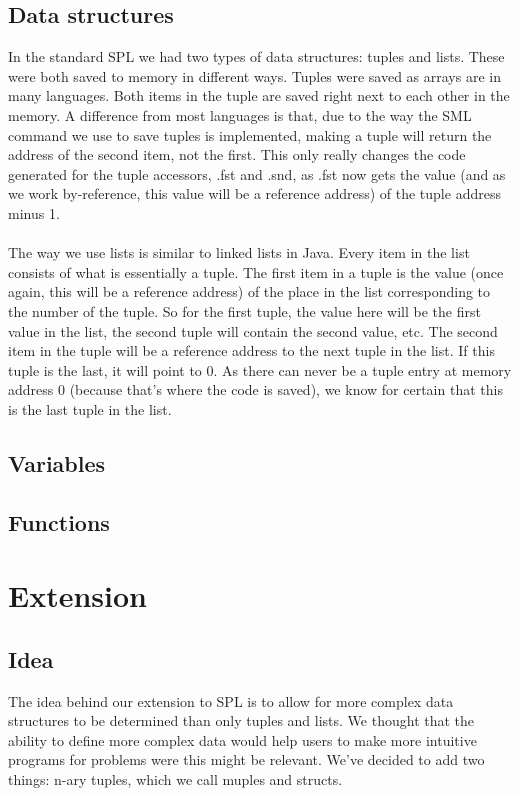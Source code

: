 \documentclass[10pt,a4paper]{article}
\begin{document}
\subsection{Data structures}
In the standard SPL we had two types of data structures: tuples and lists. These were both saved to memory in different ways. Tuples were saved as arrays are in many languages. Both items in the tuple are saved right next to each other in the memory. A difference from most languages is that, due to the way the SML command we use to save tuples is implemented, making a tuple will return the address of the second item, not the first. This only really changes the code generated for the tuple accessors, .fst and .snd, as .fst now gets the value (and as we work by-reference, this value will be a reference address) of the tuple address minus 1.\\
\\
The way we use lists is similar to linked lists in Java. Every item in the list consists of what is essentially a tuple. The first item in a tuple is the value (once again, this will be a reference address) of the place in the list corresponding to the number of the tuple. So for the first tuple, the value here will be the first value in the list, the second tuple will contain the second value, etc. The second item in the tuple will be a reference address to the next tuple in the list. If this tuple is the last, it will point to 0. As there can never be a tuple entry at memory address 0 (because that's where the code is saved), we know for certain that this is the last tuple in the list.
\subsection{Variables}
\subsection{Functions}


\section{Extension}
\subsection{Idea}
The idea behind our extension to SPL is to allow for more complex data structures to be determined than only tuples and lists. We thought that the ability to define more complex data would help users to make more intuitive programs for problems were this might be relevant. We've decided to add two things: n-ary tuples, which we call muples and structs. 
\end{document}
